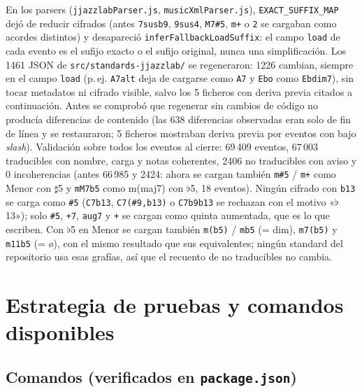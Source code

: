 \documentclass[a4paper,11pt,oneside]{report}
\newcommand{\flt}{\ensuremath{\flat}}
\newcommand{\shp}{\ensuremath{\sharp}}
\begin{document}
En los parsers (\lstinline!jjazzlabParser.js!, \lstinline!musicXmlParser.js!), \lstinline!EXACT_SUFFIX_MAP! dejó de reducir cifrados (antes \lstinline!7susb9!, \lstinline!9sus4!, \lstinline!M7#5!, \lstinline!m+! o \lstinline!2! se cargaban como acordes distintos) y desapareció \lstinline!inferFallbackLoadSuffix!: el campo \lstinline!load! de cada evento es el sufijo exacto o el sufijo original, nunca una simplificación. Los 1461 JSON de \lstinline!src/standards-jjazzlab/! se regeneraron: 1226 cambian, siempre en el campo \lstinline!load! (p.\,ej. \lstinline!A7alt! deja de cargarse como \lstinline!A7! y \lstinline!Ebo! como \lstinline!Ebdim7!), sin tocar metadatos ni cifrado visible, salvo los 5 ficheros con deriva previa citados a continuación. Antes se comprobó que regenerar sin cambios de código no producía diferencias de contenido (las 638 diferencias observadas eran solo de fin de línea y se restauraron; 5 ficheros mostraban deriva previa por eventos con bajo \textit{slash}). Validación sobre todos los eventos al cierre: 69\,409 eventos, 67\,003 traducibles con nombre, carga y notas coherentes, 2406 no traducibles con aviso y 0 incoherencias (antes 66\,985 y 2424: ahora se cargan también \lstinline!m#5! / \lstinline!m+! como Menor con \shp5 y \lstinline!mM7b5! como m(maj7) con \flt5, 18 eventos). Ningún cifrado con \lstinline!b13! se carga como \lstinline!#5! (\lstinline!C7b13!, \lstinline!C7(#9,b13)! o \lstinline!C7b9b13! se rechazan con el motivo «\flt13»); solo \lstinline!#5!, \lstinline!+7!, \lstinline!aug7! y \lstinline!+! se cargan como quinta aumentada, que es lo que escriben. Con \flt5 en Menor se cargan también \lstinline!m(b5)! / \lstinline!mb5! (= dim), \lstinline!m7(b5)! y \lstinline!m11b5! (= ø), con el mismo resultado que sus equivalentes; ningún standard del repositorio usa esas grafías, así que el recuento de no traducibles no cambia.

\chapter{Estrategia de pruebas y comandos disponibles}
\label{sec:15}

\section{Comandos (verificados en \texttt{package.json})}
\label{sec:15.1}
\end{document}

